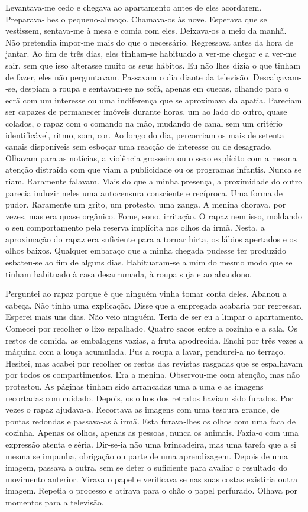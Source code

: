 Levantava­‑me cedo e chegava ao apartamento antes de eles acordarem.
Preparava­‑lhes o pequeno­‑almoço. Chamava­‑os às nove. Esperava que se
vestissem, sentava­‑me à mesa e comia com eles. Deixava­‑os a meio da
manhã. Não pretendia impor­‑me mais do que o necessário. Regressava
antes da hora de jantar. Ao fim de três dias, eles tinham­‑se habituado
a ver­‑me chegar e a ver­‑me sair, sem que isso alterasse muito os seus
hábitos. Eu não lhes dizia o que tinham de fazer, eles não perguntavam.
Passavam o dia diante da televisão. Descalçavam­‑se, despiam a roupa e
sentavam­‑se no sofá, apenas em cuecas, olhando para o ecrã com um
interesse ou uma indiferença que se aproximava da apatia. Pareciam ser
capazes de permanecer imóveis durante horas, um ao lado do outro, quase
colados, o rapaz com o comando na mão, mudando de canal sem um critério
identificável, ritmo, som, cor. Ao longo do dia, percorriam os mais de
setenta canais disponíveis sem esboçar uma reacção de interesse ou de
desagrado. Olhavam para as notícias, a violência grosseira ou o sexo
explícito com a mesma atenção distraída com que viam a publicidade ou os
programas infantis. Nunca se riam. Raramente falavam. Mais do que a
minha presença, a proximidade do outro parecia induzir neles uma
autocensura consciente e recíproca. Uma forma de pudor. Raramente um
grito, um protesto, uma zanga. A menina chorava, por vezes, mas era
quase orgânico. Fome, sono, irritação. O rapaz nem isso, moldando o seu
comportamento pela reserva implícita nos olhos da irmã. Nesta, a
aproximação do rapaz era suficiente para a tornar hirta, os lábios
apertados e os olhos baixos. Qualquer embaraço que a minha chegada
pudesse ter produzido esbateu­‑se ao fim de alguns dias. Habituaram­‑se
a mim do mesmo modo que se tinham habituado à casa desarrumada, à roupa
suja e ao abandono.

Perguntei ao rapaz porque é que ninguém vinha tomar conta deles. Abanou
a cabeça. Não tinha uma explicação. Disse que a empregada acabaria por
regressar. Esperei mais uns dias. Não veio ninguém. Teria de ser eu a
limpar o apartamento. Comecei por recolher o lixo espalhado. Quatro
sacos entre a cozinha e a sala. Os restos de comida, as embalagens
vazias, a fruta apodrecida. Enchi por três vezes a máquina com a louça
acumulada. Pus a roupa a lavar, pendurei­‑a no terraço. Hesitei, mas
acabei por recolher os restos das revistas rasgadas que se espalhavam
por todos os compartimentos. Era a menina. Observou­‑me com atenção, mas
não protestou. As páginas tinham sido arrancadas uma a uma e as imagens
recortadas com cuidado. Depois, os olhos dos retratos haviam sido
furados. Por vezes o rapaz ajudava­‑a. Recortava as imagens com uma
tesoura grande, de pontas redondas e passava­‑as à irmã. Esta
furava­‑lhes os olhos com uma faca de cozinha. Apenas os olhos, apenas
as pessoas, nunca os animais. Fazia­‑o com uma expressão atenta e séria.
Dir­‑se­‑ia não uma brincadeira, mas uma tarefa que a si mesma se
impunha, obrigação ou parte de uma aprendizagem. Depois de uma imagem,
passava a outra, sem se deter o suficiente para avaliar o resultado do
movimento anterior. Virava o papel e verificava se nas suas costas
existiria outra imagem. Repetia o processo e atirava para o chão o papel
perfurado. Olhava por momentos para a televisão.

